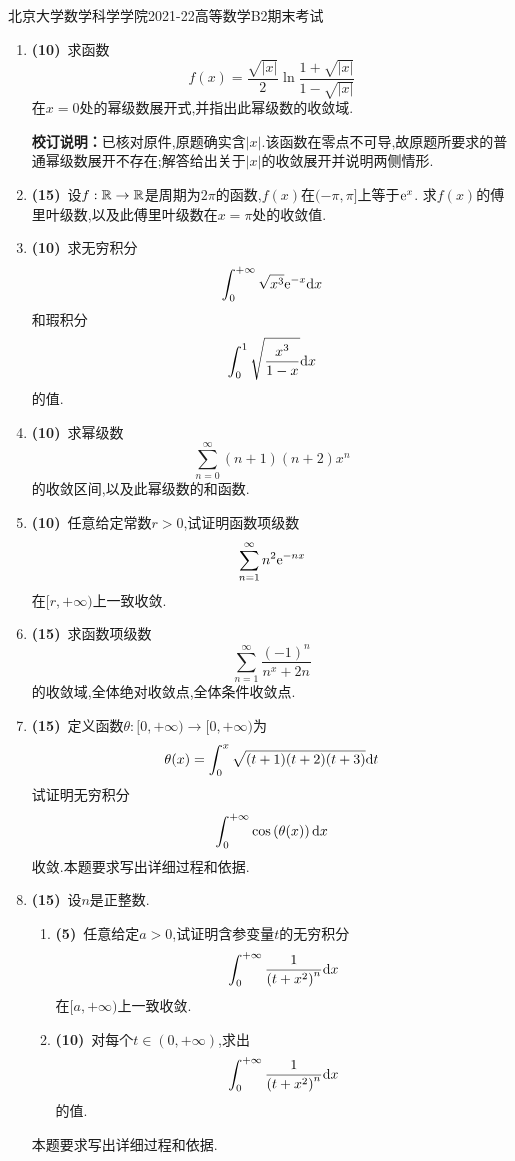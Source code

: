 \documentclass{ctexart}
\begin{document}
\pagestyle{empty}
\begin{center}\Large
    北京大学数学科学学院2021-22高等数学B2期末考试
\end{center}
\begin{enumerate}[leftmargin=*,label=\textbf{\arabic*.},topsep=0pt,parsep=0pt,itemsep=0pt,partopsep=0pt]
    \item \textbf{(10)}\ 求函数
        \[f(x)=\dfrac{\sqrt{|x|}}{2}\ln\dfrac{1+\sqrt{|x|}}{1-\sqrt{|x|}}\]
        在$x=0$处的幂级数展开式,并指出此幂级数的收敛域.
\par\textbf{校订说明：}已核对原件,原题确实含$|x|$.该函数在零点不可导,故原题所要求的普通幂级数展开不存在;解答给出关于$|x|$的收敛展开并说明两侧情形.

    \item \textbf{(15)}\ 设$f:\mathbb{R}\to\mathbb{R}$是周期为$2\pi$的函数,$f(x)$在$(-\pi,\pi]$上等于$\mathrm{e}^x$.%
        求$f(x)$的傅里叶级数,以及此傅里叶级数在$x=\pi$处的收敛值.

    \item \textbf{(10)}\ 求无穷积分
        \[\int_0^{+\infty}\sqrt{x^3}\mathrm{e}^{-x}\mathrm{d} x\]
        和瑕积分
        \[\int_0^1\sqrt{\dfrac{x^3}{1-x}}\mathrm{d} x\]
        的值.

    \item \textbf{(10)}\ 求幂级数
        \[\sum_{n=0}^{\infty}(n+1)(n+2)x^n\]
        的收敛区间,以及此幂级数的和函数.

    \item \textbf{(10)}\ 任意给定常数$r>0$,试证明函数项级数
        \[\sum_{n=1}^\infty n^2\mathrm{e}^{-nx}\]
        在$[r,+\infty)$上一致收敛.

    \item \textbf{(15)}\ 求函数项级数
        \[\sum_{n=1}^\infty\dfrac{(-1)^n}{n^x+2n}\]
        的收敛域,全体绝对收敛点,全体条件收敛点.

    \item \textbf{(15)}\ 定义函数$\theta:[0,+\infty)\to[0,+\infty)$为
        \[\theta(x)=\int_0^x\sqrt{(t+1)(t+2)(t+3)}\mathrm{d} t\]
        试证明无穷积分
        \[\int_0^{+\infty}\cos\left(\theta(x)\right)\mathrm{d} x\]
        收敛.本题要求写出详细过程和依据.

    \item \textbf{(15)}\ 设$n$是正整数.
        \begin{enumerate}[label=\tbf{(\arabic*)},topsep=0pt,parsep=0pt,itemsep=0pt,partopsep=0pt]
            \item \textbf{(5)}\ 任意给定$a>0$,试证明含参变量$t$的无穷积分
                \[\int_0^{+\infty}\dfrac{1}{\left(t+x^2\right)^n}\mathrm{d} x\]
                在$[a,+\infty)$上一致收敛.
            \item \textbf{(10)}\ 对每个$t\in(0,+\infty)$,求出
                \[\int_0^{+\infty}\dfrac{1}{\left(t+x^2\right)^n}\mathrm{d} x\]
                的值.
        \end{enumerate}
        本题要求写出详细过程和依据.

\end{enumerate}
\end{document}
